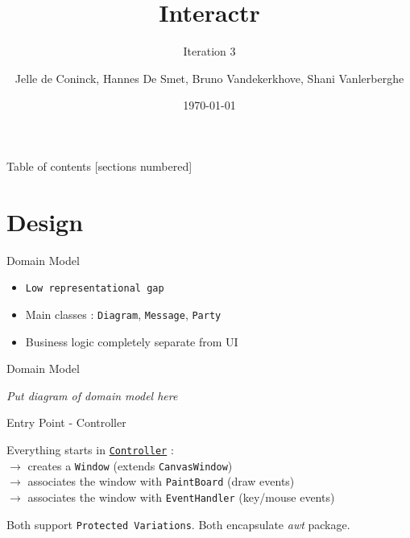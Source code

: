 \documentclass[10pt]{beamer}
\title{Interactr}
\subtitle{Iteration 3}
\date{\today}
\author{Jelle de Coninck, Hannes De Smet, Bruno Vandekerkhove, Shani Vanlerberghe}
\institute{KULeuven}
\begin{document}
\maketitle

\begin{frame}{Table of contents}
  [sections numbered]
  \tableofcontents[hideallsubsections]
\end{frame}

\section{Design}

\begin{frame}[fragile]{Domain Model}
	\begin{center}
	\begin{itemize}
	\item \texttt{Low representational gap}
	\item Main classes : \texttt{Diagram}, \texttt{Message}, \texttt{Party}
	\item Business logic completely separate from UI
	\end{itemize}
	\end{center}
\end{frame}

\begin{frame}[fragile]{Domain Model}
	\begin{center}
	\textit{Put diagram of domain model here}
	\end{center}
\end{frame}

\begin{frame}[fragile]{Entry Point - Controller}
	\begin{center}
	Everything starts in \underline{\texttt{Controller}} :
	\vspace{0.5cm}
	\\$\rightarrow$ creates a \texttt{Window} (extends \texttt{CanvasWindow})
	\\$\rightarrow$ associates the window with \texttt{PaintBoard} (draw events)
	\\$\rightarrow$ associates the window with \texttt{EventHandler} (key/mouse events)
	
	\vspace{0.5cm} Both support \texttt{Protected Variations}. Both encapsulate \textit{awt} package.
	\end{center}
\end{frame}
\end{document}

